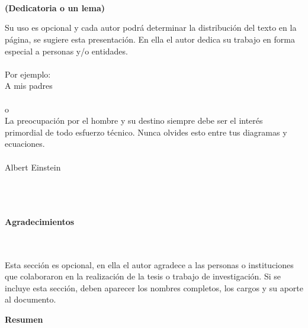 \newpage{\pagestyle{empty}\cleardoublepage}

\newpage
\thispagestyle{empty} \textbf{}\normalsize
\\\\\\%
\textbf{(Dedicatoria o un lema)}\\[4.0cm]

\begin{flushright}
\begin{minipage}{8cm}
    \noindent
        \small
        Su uso es opcional y cada autor podr\'{a} determinar la distribuci\'{o}n del texto en la p\'{a}gina, se sugiere esta presentaci\'{o}n. En ella el autor dedica su trabajo en forma especial a personas y/o entidades.\\[1.0cm]\\
        Por ejemplo:\\[1.0cm]
        A mis padres\\[1.0cm]\\
        o\\[1.0cm]
        La preocupaci\'{o}n por el hombre y su destino siempre debe ser el
        inter\'{e}s primordial de todo esfuerzo t\'{e}cnico. Nunca olvides esto
        entre tus diagramas y ecuaciones.\\\\
        Albert Einstein\\
\end{minipage}
\end{flushright}

\newpage{\pagestyle{empty}\cleardoublepage}

\newpage
\thispagestyle{empty} \textbf{}\normalsize
\\\\\\%
\textbf{\LARGE Agradecimientos}
\\\\
Esta secci\'{o}n es opcional, en ella el autor agradece a las personas o instituciones que colaboraron en la realizaci\'{o}n de la tesis  o trabajo de investigaci\'{o}n. Si se incluye esta secci\'{o}n, deben aparecer los nombres completos, los cargos y su aporte al documento.\\

\newpage{\pagestyle{empty}\cleardoublepage}

\newpage
\textbf{\LARGE Resumen}
\\\\

